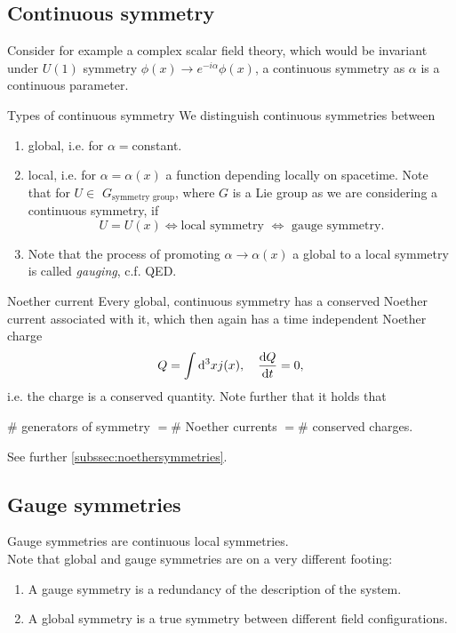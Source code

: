 \subsection{Continuous symmetry}
Consider for example a complex scalar field theory, which would be invariant under $U(1)$ symmetry $\phi(x) \rightarrow e^{-i \alpha} \phi(x)$, a continuous symmetry as $\alpha$ is a continuous parameter.
\begin{mybox}{Types of continuous symmetry}
We distinguish continuous symmetries between
\begin{enumerate}
	\item global, i.e. for $\alpha=$constant.
	\item local, i.e. for $\alpha=\alpha(x)$ a function depending locally on spacetime. Note that for $U \in$ $G_{\text{symmetry group}}$, where $G$ is a Lie group as we are considering a continuous symmetry, if
	\begin{equation*}
		U = U(x) \Leftrightarrow \text{local symmetry } \Leftrightarrow \text{ gauge symmetry}.
	\end{equation*}
	\item Note that the process of promoting $\alpha \rightarrow \alpha(x)$ a global to a local symmetry is called \emph{gauging}, c.f. QED.
\end{enumerate}
\end{mybox}
\begin{mybox}{Noether current }
	Every global, continuous symmetry has a conserved Noether current associated with it, which then again has a time independent Noether charge
	\begin{equation*}
	Q=\int \mathrm{d}^3 x j(x),\quad \frac{\mathrm{d} Q}{\mathrm{d} t}=0,
	\end{equation*}
i.e. the charge is a conserved quantity. Note further that it holds that
\begin{statements}
$\#$ generators of symmetry $=\#$ Noether currents $=\#$ conserved charges. 
\end{statements}
See further \ref{subssec:noethersymmetries}.
\end{mybox}
\subsection{Gauge symmetries}
Gauge symmetries are continuous local symmetries.\\
Note that global and gauge symmetries are on a very different footing:
\begin{enumerate}
	\item A gauge symmetry is a redundancy of the description of the system.
	\item A global symmetry is a true symmetry between different field configurations.
\end{enumerate}

